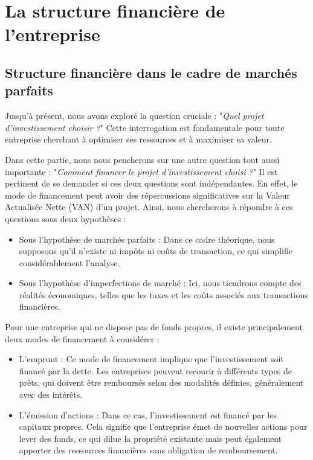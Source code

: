 \documentclass[a4paper, 12pt]{report}
\begin{document}
\part{La structure financière de l'entreprise}

\chapter{Structure financière dans le cadre de marchés parfaits}

Jusqu'à présent, nous avons exploré la question cruciale : "\textit{Quel projet d'investissement choisir ?}" Cette interrogation est fondamentale pour toute entreprise cherchant à optimiser ses ressources et à maximiser sa valeur.

Dans cette partie, nous nous pencherons sur une autre question tout aussi importante : "\textit{Comment financer le projet d'investissement choisi ?}" Il est pertinent de se demander si ces deux questions sont indépendantes. En effet, le mode de financement peut avoir des répercussions significatives sur la Valeur Actualisée Nette (VAN) d'un projet. Ainsi, nous chercherons à répondre à ces questions sous deux hypothèses :

\begin{itemize}
	\item Sous l'hypothèse de marchés parfaits : Dans ce cadre théorique, nous supposons qu'il n'existe ni impôts ni coûts de transaction, ce qui simplifie considérablement l'analyse.

	\item Sous l’hypothèse d’imperfections de marché : Ici, nous tiendrons compte des réalités économiques, telles que les taxes et les coûts associés aux transactions financières.
\end{itemize}

Pour une entreprise qui ne dispose pas de fonds propres, il existe principalement deux modes de financement à considérer :

\begin{itemize}
	\item L'emprunt : Ce mode de financement implique que l'investissement soit financé par la dette. Les entreprises peuvent recourir à différents types de prêts, qui doivent être remboursés selon des modalités définies, généralement avec des intérêts.
	\item L’émission d'actions : Dans ce cas, l'investissement est financé par les capitaux propres. Cela signifie que l'entreprise émet de nouvelles actions pour lever des fonds, ce qui dilue la propriété existante mais peut également apporter des ressources financières sans obligation de remboursement.
\end{itemize}
\end{document}
